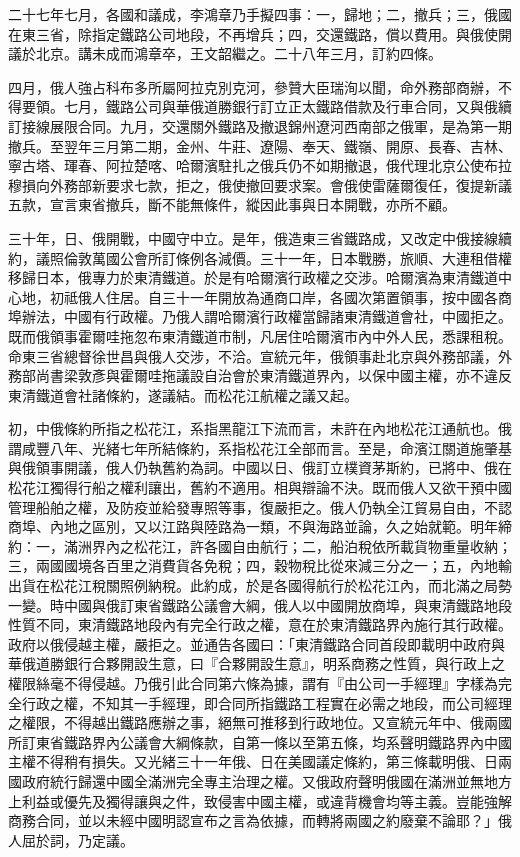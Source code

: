 \begin{pinyinscope}
二十七年七月，各國和議成，李鴻章乃手擬四事：一，歸地；二，撤兵；三，俄國在東三省，除指定鐵路公司地段，不再增兵；四，交還鐵路，償以費用。與俄使開議於北京。講未成而鴻章卒，王文韶繼之。二十八年三月，訂約四條。

四月，俄人強占科布多所屬阿拉克別克河，參贊大臣瑞洵以聞，命外務部商辦，不得要領。七月，鐵路公司與華俄道勝銀行訂立正太鐵路借款及行車合同，又與俄續訂接線展限合同。九月，交還關外鐵路及撤退錦州遼河西南部之俄軍，是為第一期撤兵。至翌年三月第二期，金州、牛莊、遼陽、奉天、鐵嶺、開原、長春、吉林、寧古塔、琿春、阿拉楚喀、哈爾濱駐扎之俄兵仍不如期撤退，俄代理北京公使布拉穆損向外務部新要求七款，拒之，俄使撤回要求案。會俄使雷薩爾復任，復提新議五款，宣言東省撤兵，斷不能無條件，縱因此事與日本開戰，亦所不顧。

三十年，日、俄開戰，中國守中立。是年，俄造東三省鐵路成，又改定中俄接線續約，議照倫敦萬國公會所訂條例各減價。三十一年，日本戰勝，旅順、大連租借權移歸日本，俄專力於東清鐵道。於是有哈爾濱行政權之交涉。哈爾濱為東清鐵道中心地，初祗俄人住居。自三十一年開放為通商口岸，各國次第置領事，按中國各商埠辦法，中國有行政權。乃俄人謂哈爾濱行政權當歸諸東清鐵道會社，中國拒之。既而俄領事霍爾哇拖忽布東清鐵道市制，凡居住哈爾濱市內中外人民，悉課租稅。命東三省總督徐世昌與俄人交涉，不洽。宣統元年，俄領事赴北京與外務部議，外務部尚書梁敦彥與霍爾哇拖議設自治會於東清鐵道界內，以保中國主權，亦不違反東清鐵道會社諸條約，遂議結。而松花江航權之議又起。

初，中俄條約所指之松花江，系指黑龍江下流而言，未許在內地松花江通航也。俄謂咸豐八年、光緒七年所結條約，系指松花江全部而言。至是，命濱江關道施肇基與俄領事開議，俄人仍執舊約為詞。中國以日、俄訂立樸資茅斯約，已將中、俄在松花江獨得行船之權利讓出，舊約不適用。相與辯論不決。既而俄人又欲干預中國管理船舶之權，及防疫並給發專照等事，復嚴拒之。俄人仍執全江貿易自由，不認商埠、內地之區別，又以江路與陸路為一類，不與海路並論，久之始就範。明年締約：一，滿洲界內之松花江，許各國自由航行；二，船泊稅依所載貨物重量收納；三，兩國國境各百里之消費貨各免稅；四，穀物稅比從來減三分之一；五，內地輸出貨在松花江稅關照例納稅。此約成，於是各國得航行於松花江內，而北滿之局勢一變。時中國與俄訂東省鐵路公議會大綱，俄人以中國開放商埠，與東清鐵路地段性質不同，東清鐵路地段內有完全行政之權，意在於東清鐵路界內施行其行政權。政府以俄侵越主權，嚴拒之。並通告各國曰：「東清鐵路合同首段即載明中政府與華俄道勝銀行合夥開設生意，曰『合夥開設生意』，明系商務之性質，與行政上之權限絲毫不得侵越。乃俄引此合同第六條為據，謂有『由公司一手經理』字樣為完全行政之權，不知其一手經理，即合同所指鐵路工程實在必需之地段，而公司經理之權限，不得越出鐵路應辦之事，絕無可推移到行政地位。又宣統元年中、俄兩國所訂東省鐵路界內公議會大綱條款，自第一條以至第五條，均系聲明鐵路界內中國主權不得稍有損失。又光緒三十一年俄、日在美國議定條約，第三條載明俄、日兩國政府統行歸還中國全滿洲完全專主治理之權。又俄政府聲明俄國在滿洲並無地方上利益或優先及獨得讓與之件，致侵害中國主權，或違背機會均等主義。豈能強解商務合同，並以未經中國明認宣布之言為依據，而轉將兩國之約廢棄不論耶？」俄人屈於詞，乃定議。


\end{pinyinscope}
